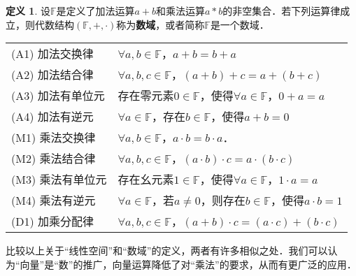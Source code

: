 \documentclass[a4paper,fontset=windows]{ctexbook}
\theoremstyle{definition}
\newtheorem{definition}{定义}[chapter]
\begin{document}
\begin{definition}\label{def8.2}
设$\mathbb{F}$是定义了加法运算$a+b$和乘法运算$a*b$的非空集合．若下列运算律成立，则代数结构$(\mathbb{F},+,\cdot)$称为{\bf 数域}，或者简称$\mathbb{F}$是一个数域．
\begin{center}\begin{tabular}{ll}
(A1) 加法交换律 & $\forall a,b\in\mathbb{F}$，$a+b=b+a$ \\
(A2) 加法结合律 & $\forall a,b,c\in\mathbb{F}$，$(a+b)+c=a+(b+c)$ \\
(A3) 加法有单位元 & 存在零元素$0\in\mathbb{F}$，使得$\forall a\in\mathbb{F}$，$0+a=a$ \\
(A4) 加法有逆元 & $\forall a\in\mathbb{F}$，存在$b\in\mathbb{F}$，使得$a+b=0$ \\
(M1) 乘法交换律 & $\forall a,b\in\mathbb{F}$，$a\cdot b=b\cdot a$． \\
(M2) 乘法结合律 & $\forall a,b,c\in\mathbb{F}$，$(a\cdot b)\cdot c=a\cdot(b\cdot c)$ \\
(M3) 乘法有单位元 & 存在幺元素$1\in\mathbb{F}$，使得$\forall a\in\mathbb{F}$，$1\cdot a=a$ \\
(M4) 乘法有逆元 & $\forall a\in\mathbb{F}$，若$a\ne 0$，则存在$b\in\mathbb{F}$，使得$a\cdot b=1$ \\
(D1) 加乘分配律 & $\forall a,b,c\in\mathbb{F}$，$(a+b)\cdot c=(a\cdot c)+(b\cdot c)$
\end{tabular}\end{center}
\end{definition}

比较以上关于“线性空间”和“数域”的定义，两者有许多相似之处．我们可以认为“向量”是“数”的推广，向量运算降低了对“乘法”的要求，从而有更广泛的应用．
\end{document}
